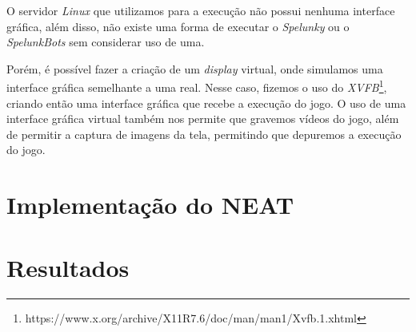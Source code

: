 O servidor \textit{Linux} que utilizamos para a execução não possui nenhuma
interface gráfica, além disso, não existe uma forma de executar o
\textit{Spelunky} ou o \textit{SpelunkBots} sem considerar uso de uma.

Porém, é possível fazer a criação de um \textit{display} virtual, onde
simulamos uma interface gráfica semelhante a uma real. Nesse caso, fizemos o
uso do
\textit{XVFB}\footnote{https://www.x.org/archive/X11R7.6/doc/man/man1/Xvfb.1.xhtml},
criando então uma interface gráfica que recebe a execução do jogo. O uso de uma
interface gráfica virtual também nos permite que gravemos vídeos do jogo, além
de permitir a captura de imagens da tela, permitindo que depuremos a execução
do jogo.

\section{\label{section:neat-details}Implementação do NEAT}


\section{\label{section:results}Resultados}

